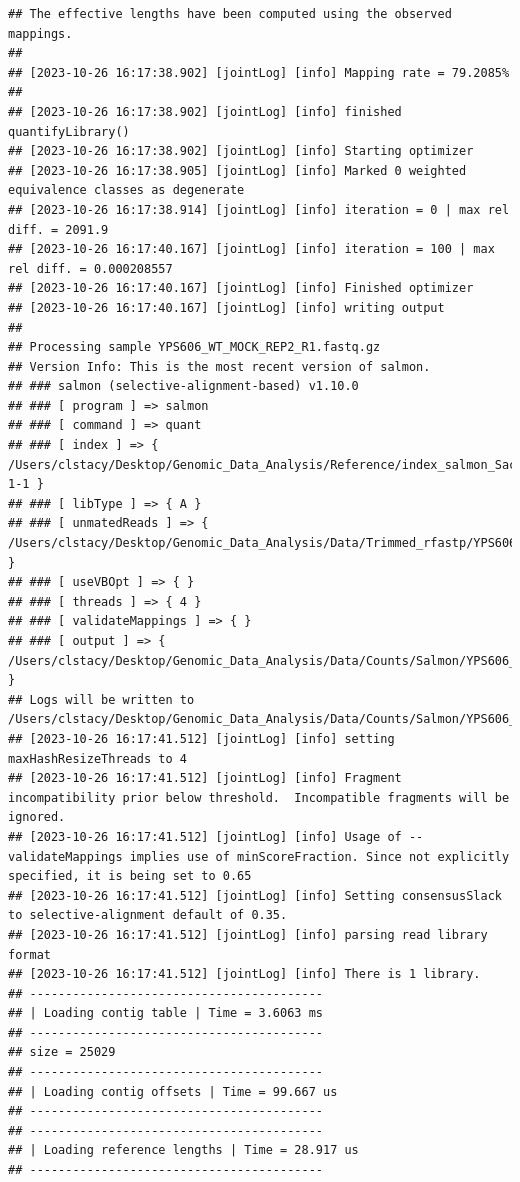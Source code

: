 \documentclass[
]{book}
\begin{document}
\begin{verbatim}
## The effective lengths have been computed using the observed mappings.
## 
## [2023-10-26 16:17:38.902] [jointLog] [info] Mapping rate = 79.2085%
## 
## [2023-10-26 16:17:38.902] [jointLog] [info] finished quantifyLibrary()
## [2023-10-26 16:17:38.902] [jointLog] [info] Starting optimizer
## [2023-10-26 16:17:38.905] [jointLog] [info] Marked 0 weighted equivalence classes as degenerate
## [2023-10-26 16:17:38.914] [jointLog] [info] iteration = 0 | max rel diff. = 2091.9
## [2023-10-26 16:17:40.167] [jointLog] [info] iteration = 100 | max rel diff. = 0.000208557
## [2023-10-26 16:17:40.167] [jointLog] [info] Finished optimizer
## [2023-10-26 16:17:40.167] [jointLog] [info] writing output 
## 
## Processing sample YPS606_WT_MOCK_REP2_R1.fastq.gz
## Version Info: This is the most recent version of salmon.
## ### salmon (selective-alignment-based) v1.10.0
## ### [ program ] => salmon 
## ### [ command ] => quant 
## ### [ index ] => { /Users/clstacy/Desktop/Genomic_Data_Analysis/Reference/index_salmon_Saccharomyces_cerevisiae.R64-1-1 }
## ### [ libType ] => { A }
## ### [ unmatedReads ] => { /Users/clstacy/Desktop/Genomic_Data_Analysis/Data/Trimmed_rfastp/YPS606_WT_MOCK_REP2_R1.fastq.gz }
## ### [ useVBOpt ] => { }
## ### [ threads ] => { 4 }
## ### [ validateMappings ] => { }
## ### [ output ] => { /Users/clstacy/Desktop/Genomic_Data_Analysis/Data/Counts/Salmon/YPS606_WT_MOCK_REP2_R1.fastq.gz_quant }
## Logs will be written to /Users/clstacy/Desktop/Genomic_Data_Analysis/Data/Counts/Salmon/YPS606_WT_MOCK_REP2_R1.fastq.gz_quant/logs
## [2023-10-26 16:17:41.512] [jointLog] [info] setting maxHashResizeThreads to 4
## [2023-10-26 16:17:41.512] [jointLog] [info] Fragment incompatibility prior below threshold.  Incompatible fragments will be ignored.
## [2023-10-26 16:17:41.512] [jointLog] [info] Usage of --validateMappings implies use of minScoreFraction. Since not explicitly specified, it is being set to 0.65
## [2023-10-26 16:17:41.512] [jointLog] [info] Setting consensusSlack to selective-alignment default of 0.35.
## [2023-10-26 16:17:41.512] [jointLog] [info] parsing read library format
## [2023-10-26 16:17:41.512] [jointLog] [info] There is 1 library.
## -----------------------------------------
## | Loading contig table | Time = 3.6063 ms
## -----------------------------------------
## size = 25029
## -----------------------------------------
## | Loading contig offsets | Time = 99.667 us
## -----------------------------------------
## -----------------------------------------
## | Loading reference lengths | Time = 28.917 us
## -----------------------------------------

\end{verbatim}
\end{document}

